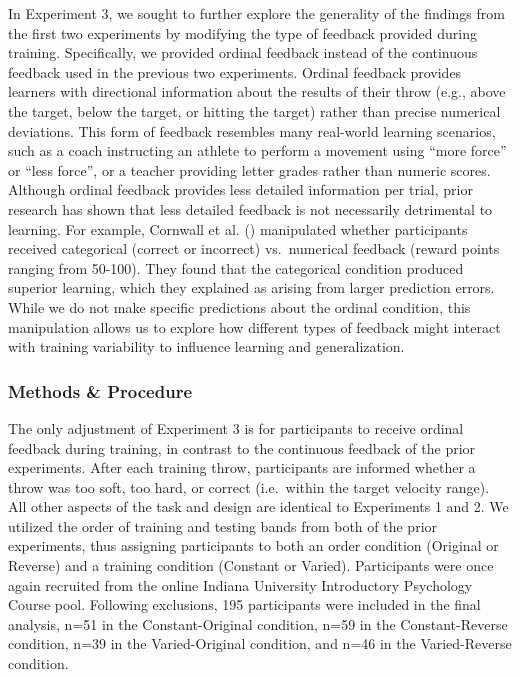 \documentclass[
  11pt,
  letterpaper,
]{article}
\begin{document}
In Experiment 3, we sought to further explore the generality of the
findings from the first two experiments by modifying the type of
feedback provided during training. Specifically, we provided ordinal
feedback instead of the continuous feedback used in the previous two
experiments. Ordinal feedback provides learners with directional
information about the results of their throw (e.g., above the target,
below the target, or hitting the target) rather than precise numerical
deviations. This form of feedback resembles many real-world learning
scenarios, such as a coach instructing an athlete to perform a movement
using ``more force'' or ``less force'', or a teacher providing letter
grades rather than numeric scores. Although ordinal feedback provides
less detailed information per trial, prior research has shown that less
detailed feedback is not necessarily detrimental to learning. For
example, Cornwall et al.
()
manipulated whether participants received categorical (correct or
incorrect) vs.~numerical feedback (reward points ranging from 50-100).
They found that the categorical condition produced superior learning,
which they explained as arising from larger prediction errors. While we
do not make specific predictions about the ordinal condition, this
manipulation allows us to explore how different types of feedback might
interact with training variability to influence learning and
generalization.

\subsubsection{Methods \& Procedure}\label{methods-procedure-1}

The only adjustment of Experiment 3 is for participants to receive
ordinal feedback during training, in contrast to the continuous feedback
of the prior experiments. After each training throw, participants are
informed whether a throw was too soft, too hard, or correct (i.e.~within
the target velocity range). All other aspects of the task and design are
identical to Experiments 1 and 2. We utilized the order of training and
testing bands from both of the prior experiments, thus assigning
participants to both an order condition (Original or Reverse) and a
training condition (Constant or Varied). Participants were once again
recruited from the online Indiana University Introductory Psychology
Course pool. Following exclusions, 195 participants were included in the
final analysis, n=51 in the Constant-Original condition, n=59 in the
Constant-Reverse condition, n=39 in the Varied-Original condition, and
n=46 in the Varied-Reverse condition.
\end{document}
